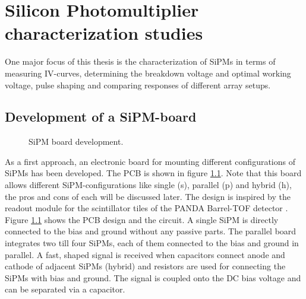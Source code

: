 \chapter{Silicon Photomultiplier characterization studies}
One major focus of this thesis is the characterization of SiPMs in terms of measuring IV-curves, determining the breakdown voltage and optimal working voltage, pulse shaping and comparing responses of different array setups.
\section{Development of a SiPM-board}
\begin{figure}[b!]
	\hfill
	\hfill
	\caption[SiPM circuit configurations]{SiPM board development.  }
	\label{fig:ch4:PCB}
\end{figure}
As a first approach, an electronic board for mounting different configurations of SiPMs has been developed. The PCB is shown in figure \ref{fig:ch4:PCB}. Note that this board allows different SiPM-configurations like single (s), parallel (p) and hybrid (h), the pros and cons of each will be discussed later. The design is inspired by the readout module for the scintillator tiles of the PANDA Barrel-TOF detector \cite{SciTil}. Figure \ref{fig:ch4:PCB} shows the PCB design and the circuit. A single SiPM is directly connected to the bias and ground without any passive parts. The parallel board integrates two till four SiPMs, each of them connected to the bias and ground in parallel. A fast, shaped signal is received when capacitors connect anode and cathode of adjacent SiPMs (hybrid) and resistors are used for connecting the SiPMs with bias and ground. The signal is coupled onto the DC bias voltage and can be separated via a capacitor.  \par 
